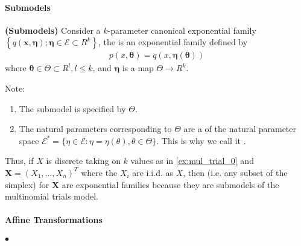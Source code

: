 \documentclass{article}
\newcommand{\bfs}[1]{\textbf{({#1}) }}
\begin{document}
\paragraph{Submodels}

\begin{defa}\bfs{Submodels}\label{def:sub}
 Consider a $k$-parameter canonical exponential family $\left\{q(\mathbf{x}, \boldsymbol{\eta}) ; \boldsymbol{\eta} \in \mathcal{E} \subset R^{k}\right\}$, the  is an exponential family defined by
\begin{align}
p(x, \boldsymbol{\theta})=q(x, \boldsymbol{\eta}(\boldsymbol{\theta}))\label{eq:sub}
\end{align}
where $\boldsymbol{\theta} \in \Theta \subset R^{l}, l \leq k$, and $\boldsymbol{\eta}$ is a map $\Theta \rightarrow R^{k}$. 
\end{defa}
\begin{rema} Note:
\begin{enumerate}
    \item The submodel is specified by $\Theta$.
    \item The natural parameters corresponding to $\Theta$ are a  of the natural parameter space $\mathcal{E}^{*}=\{\eta \in \mathcal{E}: \eta=\eta(\theta), \theta \in \Theta\}$. This is why we call it .
\end{enumerate}
\end{rema}

\begin{exma}
Thus, if $X$ is discrete taking on $k$ values as in \cref{ex:mul_trial_0} and $\mathbf{X}=\left(X_{1}, \ldots, X_{n}\right)^{T}$ where the $X_{i}$ are i.i.d. as $X$, then  (i.e. any subset of the simplex) for $\mathbf{X}$ are exponential families because they are submodels of the multinomial trials model.
\end{exma}

\paragraph{Affine Transformations}
$\bullet$ 
\end{document}
